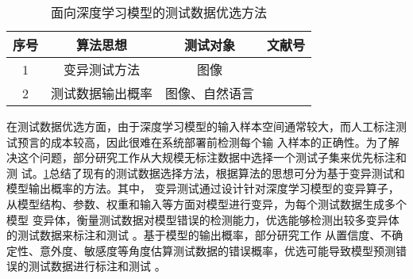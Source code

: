 \begin{table}[htp]
	\renewcommand\arraystretch{1.5}
	\small
	\centering
	\caption{面向深度学习模型的测试数据优选方法}
	\label{tab:testingDataPri}
	\begin{tabular}{cccc}
		\toprule
		\textbf{序号} & \textbf{算法思想} & \textbf{测试对象} & \textbf{文献号}                                                                                                          \\
		\midrule
		1             & 变异测试方法      & 图像              & \cite{Wang2021Prioritizing}\cite{Ma2018DeepMutation}  \cite{Liu2022DeepState}                                            \\
		2             & 测试数据输出概率  & 图像、自然语言    & \cite{Byun2019Input}\cite{Shen2020MultipleBoundary}\cite{Feng2020DeepGini}\cite{Hu2022AnEmpirical}\cite{Gao2022Adaptive} \\
		\bottomrule
	\end{tabular}
\end{table}

在测试数据优选方面，由于深度学习模型的输入样本空间通常较大，而人工标注测试预言的成本较高，因此很难在系统部署前检测每个输
入样本的正确性。为了解决这个问题，部分研究工作从大规模无标注数据中选择一个测试子集来优先标注和测
试。\cref{tab:testingDataPri}总结了现有的测试数据选择方法，根据算法的思想可分为基于变异测试和模型输出概率的方法。其中，
变异测试通过设计针对深度学习模型的变异算子，从模型结构、参数、权重和输入等方面对模型进行变异，为每个测试数据生成多个模型
变异体，衡量测试数据对模型错误的检测能力，优选能够检测出较多变异体的测试数据来标注和测试
。{基于模型的输出概率}，部分研究工作
从置信度、不确定性、意外度、敏感度等角度估算测试数据的错误概率，优选可能导致模型预测错误的测试数据进行标注和测试
。

